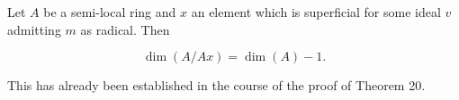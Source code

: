 Let $A$ be a semi-local ring and $x$ an element which is superficial for some ideal $v$ admitting $m$ as radical. Then

$$\dim (A/Ax) = \dim (A) - 1.$$

This has already been established in the course of the proof of Theorem 20.